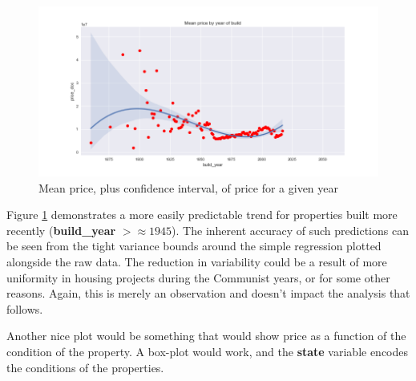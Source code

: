 \documentclass[12pt]{article}
\theoremstyle{plain} %
\theoremstyle{definition} %
\theoremstyle{remark} %
\begin{document}
\begin{figure}[h!]
\begin{center}
\includegraphics[width=12cm]{./output_images/mean_price_year.png}
\caption{Mean price, plus confidence interval, of price for a given year}
\label{fig:four}
\end{center}
\end{figure}

\par Figure \ref{fig:four} demonstrates a more easily predictable trend for properties built more recently (\textbf{build\_year} $> \approx 1945$).  The inherent accuracy of such predictions can be seen from the tight variance bounds around the simple regression plotted alongside the raw data.  The reduction in variability could be a result of more uniformity in housing projects during the Communist years, or for some other reasons.  Again, this is merely an observation and doesn't impact the analysis that follows.

\par Another nice plot would be something that would show price as a function of the condition of the property.  A box-plot would work, and the \textbf{state} variable encodes the conditions of the properties.
\end{document}
